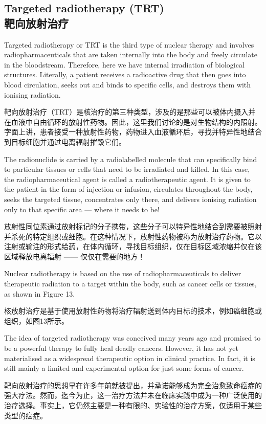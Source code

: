 \documentclass[dvipsnames, svgnames,a4paper,11pt]{article}
\begin{document}
\subsection{Targeted radiotherapy (TRT) \\靶向放射治疗}  
Targeted radiotherapy or TRT is the third type of nuclear therapy and involves radiopharmaceuticals that are taken internally into the body and freely circulate in the bloodstream. Therefore, here we have internal irradiation of biological structures. Literally, a patient receives a radioactive drug that then goes into blood circulation, seeks out and binds to specific cells, and destroys them with ionising radiation.  

靶向放射治疗（TRT）是核治疗的第三种类型，涉及的是那些可以被体内摄入并在血液中自由循环的放射性药物。因此，这里我们讨论的是对生物结构的内照射。字面上讲，患者接受一种放射性药物，药物进入血液循环后，寻找并特异性地结合到目标细胞并通过电离辐射摧毁它们。  

The radionuclide is carried by a radiolabelled molecule that can specifically bind to particular tissues or cells that need to be irradiated and killed. In this case, the radiopharmaceutical agent is called a radiotherapeutic agent. It is given to the patient in the form of injection or infusion, circulates throughout the body, seeks the targeted tissue, concentrates only there, and delivers ionising radiation only to that specific area — where it needs to be!  

放射性同位素通过放射标记的分子携带，这些分子可以特异性地结合到需要被照射并杀死的特定组织或细胞。在这种情况下，放射性药物被称为放射治疗药物。它以注射或输注的形式给药，在体内循环，寻找目标组织，仅在目标区域浓缩并仅在该区域释放电离辐射 —— 仅仅在需要的地方！  

Nuclear radiotherapy is based on the use of radiopharmaceuticals to deliver therapeutic radiation to a target within the body, such as cancer cells or tissues, as shown in Figure 13.  

核放射治疗是基于使用放射性药物将治疗辐射送到体内目标的技术，例如癌细胞或组织，如图13所示。  

The idea of targeted radiotherapy was conceived many years ago and promised to be a powerful therapy to fully heal deadly cancers. However, it has not yet materialised as a widespread therapeutic option in clinical practice. In fact, it is still mainly a limited and experimental option for just some forms of cancer.


靶向放射治疗的思想早在许多年前就被提出，并承诺能够成为完全治愈致命癌症的强大疗法。然而，迄今为止，这一治疗方法并未在临床实践中成为一种广泛使用的治疗选择。事实上，它仍然主要是一种有限的、实验性的治疗方案，仅适用于某些类型的癌症。
\end{document}
